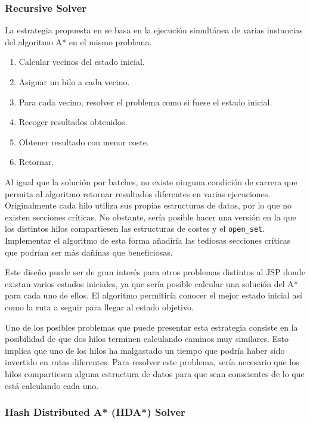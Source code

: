 \subsubsection{Recursive Solver}

La estrategia propuesta en \cite{Zag17} se basa en la ejecución
simultánea de varias instancias del algoritmo A* en el mismo problema.
\begin{enumerate}[itemsep=0.25px]
    \item Calcular vecinos del estado inicial.
    \item Asignar un hilo a cada vecino.
    \item Para cada vecino, resolver el problema como si fuese el estado inicial.
    \item Recoger resultados obtenidos.
    \item Obtener resultado con menor coste.
    \item Retornar.
\end{enumerate}

Al igual que la solución por batches,
no existe ninguna condición de carrera que permita
al algoritmo retornar resultados diferentes
en varias ejecuciones.
Originalmente cada hilo utiliza sus propias estructuras
de datos, por lo que no existen secciones críticas.
No obstante, sería posible hacer una versión en la que
los distintos hilos compartiesen las estructuras de costes
y el \lstinline{open_set}.
Implementar el algoritmo de esta forma añadiría las
tediosas secciones críticas que podrían ser más
dañinas que beneficiosas.

Este diseño puede ser de gran interés para otros problemas
distintos al JSP donde existan varios estados iniciales,
ya que sería posible calcular una solución del A*
para cada uno de ellos.
El algoritmo permitiría conocer el mejor estado inicial
así como la ruta a seguir para llegar al estado objetivo.

Uno de los posibles problemas que puede presentar esta
estrategia consiste en la posibilidad de que dos hilos
terminen calculando caminos muy similares.
Esto implica que uno de los hilos ha malgastado un tiempo
que podría haber sido invertido en rutas diferentes.
Para resolver este problema, sería necesario que
los hilos compartiesen alguna estructura de datos
para que sean conscientes de lo que está calculando cada uno.

\pagebreak

\subsubsection{Hash Distributed A* (HDA*) Solver}

